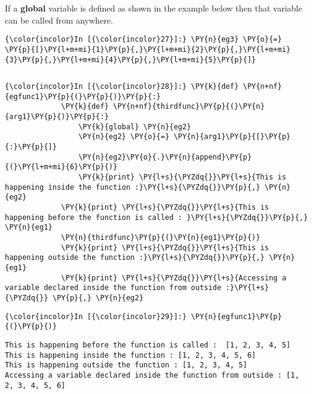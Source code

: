     If a \textbf{global} variable is defined as shown in the example below
then that variable can be called from anywhere.

    \begin{Verbatim}[commandchars=\\\{\}]
{\color{incolor}In [{\color{incolor}27}]:} \PY{n}{eg3} \PY{o}{=} \PY{p}{[}\PY{l+m+mi}{1}\PY{p}{,}\PY{l+m+mi}{2}\PY{p}{,}\PY{l+m+mi}{3}\PY{p}{,}\PY{l+m+mi}{4}\PY{p}{,}\PY{l+m+mi}{5}\PY{p}{]}
\end{Verbatim}

    \begin{Verbatim}[commandchars=\\\{\}]

    \end{Verbatim}

    \begin{Verbatim}[commandchars=\\\{\}]
{\color{incolor}In [{\color{incolor}28}]:} \PY{k}{def} \PY{n+nf}{egfunc1}\PY{p}{(}\PY{p}{)}\PY{p}{:}
             \PY{k}{def} \PY{n+nf}{thirdfunc}\PY{p}{(}\PY{n}{arg1}\PY{p}{)}\PY{p}{:}
                 \PY{k}{global} \PY{n}{eg2}
                 \PY{n}{eg2} \PY{o}{=} \PY{n}{arg1}\PY{p}{[}\PY{p}{:}\PY{p}{]}
                 \PY{n}{eg2}\PY{o}{.}\PY{n}{append}\PY{p}{(}\PY{l+m+mi}{6}\PY{p}{)}
                 \PY{k}{print} \PY{l+s}{\PYZdq{}}\PY{l+s}{This is happening inside the function :}\PY{l+s}{\PYZdq{}}\PY{p}{,} \PY{n}{eg2} 
             \PY{k}{print} \PY{l+s}{\PYZdq{}}\PY{l+s}{This is happening before the function is called : }\PY{l+s}{\PYZdq{}}\PY{p}{,} \PY{n}{eg1}
             \PY{n}{thirdfunc}\PY{p}{(}\PY{n}{eg1}\PY{p}{)}
             \PY{k}{print} \PY{l+s}{\PYZdq{}}\PY{l+s}{This is happening outside the function :}\PY{l+s}{\PYZdq{}}\PY{p}{,} \PY{n}{eg1}   
             \PY{k}{print} \PY{l+s}{\PYZdq{}}\PY{l+s}{Accessing a variable declared inside the function from outside :}\PY{l+s}{\PYZdq{}} \PY{p}{,} \PY{n}{eg2}
\end{Verbatim}

    \begin{Verbatim}[commandchars=\\\{\}]
{\color{incolor}In [{\color{incolor}29}]:} \PY{n}{egfunc1}\PY{p}{(}\PY{p}{)}
\end{Verbatim}

    \begin{Verbatim}[commandchars=\\\{\}]
This is happening before the function is called :  [1, 2, 3, 4, 5]
This is happening inside the function : [1, 2, 3, 4, 5, 6]
This is happening outside the function : [1, 2, 3, 4, 5]
Accessing a variable declared inside the function from outside : [1, 2, 3, 4, 5, 6]
    \end{Verbatim}

